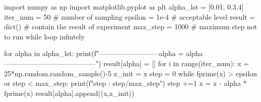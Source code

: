 \documentclass[10pt]{article}
\begin{document}
\begin{python}
import numpy as np
import matplotlib.pyplot as plt
alpha_lst = [0.01, 0.3,4]
iter_num = 50 # number of sampling
epsilon = 1e-4 # acceptable level
result = dict() # contain the result of experiment
max_step = 1000 # maximum step not to run while loop infintely

for alpha in alpha_lst:
    print(f"--------------------------alpha = {alpha}---------------------------------------")
    result[alpha] = []
    for i in range(iter_num):
        x = 25*np.random.random_sample()-5
        x_init = x
        step = 0
        while fprime(x) > epsilon or step < max_step:
            print(f"step : {step}/{max_step}")
            step +=1
            x = x - alpha * fprime(x)
        result[alpha].append((x,x_init))
\end{python}



\end{document}
